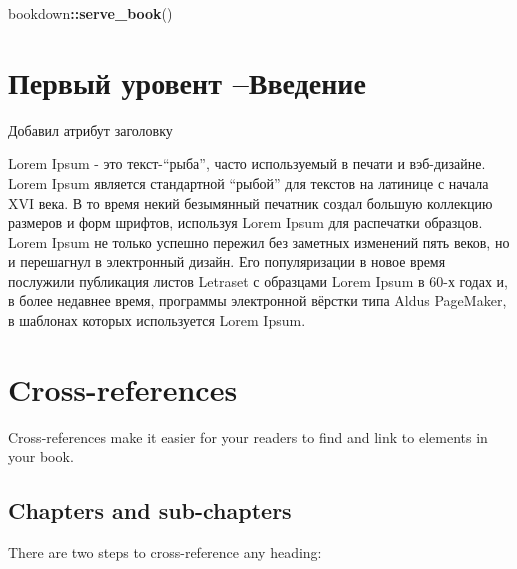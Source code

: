 \documentclass[
  12pt,
  a4paper,
]{book}
\newenvironment{Shaded}{\begin{snugshade}}{\end{snugshade}}
\newcommand{\FunctionTok}[1]{\textcolor[rgb]{0.13,0.29,0.53}{\textbf{#1}}}
\newcommand{\NormalTok}[1]{#1}
\newcommand{\SpecialCharTok}[1]{\textcolor[rgb]{0.81,0.36,0.00}{\textbf{#1}}}
\theoremstyle{definition}
\theoremstyle{definition}
\theoremstyle{definition}
\theoremstyle{definition}
\theoremstyle{remark}
\begin{document}
\begin{Shaded}
\begin{Highlighting}[]
\NormalTok{bookdown}\SpecialCharTok{::}\FunctionTok{serve\_book}\NormalTok{()}
\end{Highlighting}
\end{Shaded}

\chapter{Первый уровент --Введение}\label{intro}

Добавил атрибут заголовку

Lorem Ipsum - это текст-``рыба'', часто используемый в печати и вэб-дизайне. Lorem Ipsum является стандартной ``рыбой'' для текстов на латинице с начала XVI века. В то время некий безымянный печатник создал большую коллекцию размеров и форм шрифтов, используя Lorem Ipsum для распечатки образцов. Lorem Ipsum не только успешно пережил без заметных изменений пять веков, но и перешагнул в электронный дизайн. Его популяризации в новое время послужили публикация листов Letraset с образцами Lorem Ipsum в 60-х годах и, в более недавнее время, программы электронной вёрстки типа Aldus PageMaker, в шаблонах которых используется Lorem Ipsum.

\chapter{Cross-references}\label{cross}

Cross-references make it easier for your readers to find and link to elements in your book.

\section{Chapters and sub-chapters}\label{chapters-and-sub-chapters}

There are two steps to cross-reference any heading:
\end{document}
